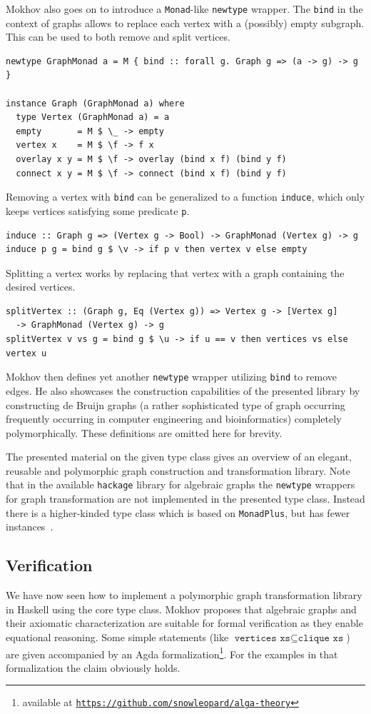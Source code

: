 \documentclass{article}
\newcommand{\hs}{\texttt}
\begin{document}
Mokhov also goes on to introduce a \hs{Monad}-like \hs{newtype} wrapper. The
\hs{bind} in the context of graphs allows to replace each vertex with a
(possibly) empty subgraph. This can be used to both remove and split vertices.
\begin{verbatim}
newtype GraphMonad a = M { bind :: forall g. Graph g => (a -> g) -> g }

instance Graph (GraphMonad a) where
  type Vertex (GraphMonad a) = a
  empty       = M $ \_ -> empty
  vertex x    = M $ \f -> f x
  overlay x y = M $ \f -> overlay (bind x f) (bind y f)
  connect x y = M $ \f -> connect (bind x f) (bind y f)
\end{verbatim}
Removing a vertex with \hs{bind} can be generalized to a function \hs{induce},
which only keeps vertices satisfying some predicate \hs{p}.
\begin{verbatim}
induce :: Graph g => (Vertex g -> Bool) -> GraphMonad (Vertex g) -> g
induce p g = bind g $ \v -> if p v then vertex v else empty
\end{verbatim}
Splitting a vertex works by replacing that vertex with a graph containing the
desired vertices.
\begin{verbatim}
splitVertex :: (Graph g, Eq (Vertex g)) => Vertex g -> [Vertex g] 
  -> GraphMonad (Vertex g) -> g
splitVertex v vs g = bind g $ \u -> if u == v then vertices vs else vertex u
\end{verbatim}
Mokhov then defines yet another \hs{newtype} wrapper utilizing \hs{bind} to
remove edges. He also showcases the construction capabilities of the presented
library by constructing de Bruijn graphs (a rather sophisticated type of graph
occurring frequently occurring in computer engineering and bioinformatics)
completely polymorphically. These definitions are omitted here for brevity.

The presented material on the given type class gives an overview of an elegant,
reusable and polymorphic graph construction and transformation library. Note
that in the available \texttt{hackage} library for algebraic graphs the
\hs{newtype} wrappers for graph transformation are not implemented in the
presented type class. Instead there is a higher-kinded type class which is based
on \hs{MonadPlus}, but has fewer instances~\cite{mokhov2017algebraic}.

\subsection{Verification}\label{sec:verification}
We have now seen how to implement a polymorphic graph transformation library in
Haskell using the core type class. Mokhov proposes that algebraic graphs and
their axiomatic characterization are suitable for formal verification as they
enable equational reasoning. Some
simple statements (like $\hs{vertices xs} \subseteq \hs{clique xs}$) are given
accompanied by an Agda formalization\footnote{available at
  \texttt{\href{https://github.com/snowleopard/alga-theory}{https://github.com/snowleopard/alga-theory}}}.
For the examples in that formalization the claim obviously holds.
\end{document}
